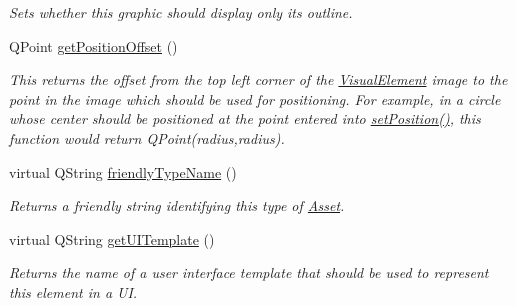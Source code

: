 \begin{DoxyCompactItemize}
\begin{DoxyCompactList}\small\item\em Sets whether this graphic should display only its outline. \end{DoxyCompactList}\item 
\hypertarget{class_picto_1_1_diamond_graphic_a707839820980a3622f1608764ce785ff}{Q\-Point \hyperlink{class_picto_1_1_diamond_graphic_a707839820980a3622f1608764ce785ff}{get\-Position\-Offset} ()}\label{class_picto_1_1_diamond_graphic_a707839820980a3622f1608764ce785ff}

\begin{DoxyCompactList}\small\item\em This returns the offset from the top left corner of the \hyperlink{struct_picto_1_1_visual_element}{Visual\-Element} image to the point in the image which should be used for positioning. For example, in a circle whose center should be positioned at the point entered into \hyperlink{struct_picto_1_1_visual_element_a454cc96862097e96a0b0f1d2c83e23ed}{set\-Position()}, this function would return Q\-Point(radius,radius). \end{DoxyCompactList}\item 
virtual Q\-String \hyperlink{class_picto_1_1_diamond_graphic_aeb5cca8bc8625611fdc1623596a43f43}{friendly\-Type\-Name} ()
\begin{DoxyCompactList}\small\item\em Returns a friendly string identifying this type of \hyperlink{class_picto_1_1_asset}{Asset}. \end{DoxyCompactList}\item 
\hypertarget{class_picto_1_1_diamond_graphic_ad175e9a45b99d8947e873097afcf324e}{virtual Q\-String \hyperlink{class_picto_1_1_diamond_graphic_ad175e9a45b99d8947e873097afcf324e}{get\-U\-I\-Template} ()}\label{class_picto_1_1_diamond_graphic_ad175e9a45b99d8947e873097afcf324e}

\begin{DoxyCompactList}\small\item\em Returns the name of a user interface template that should be used to represent this element in a U\-I. \end{DoxyCompactList}\end{DoxyCompactItemize}
